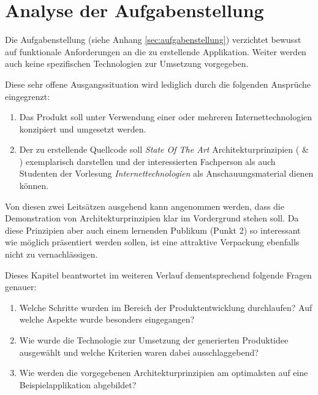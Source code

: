 \chapter{Analyse der Aufgabenstellung}

Die Aufgabenstellung (siehe Anhang \ref{sec:aufgabenstellung}) verzichtet bewusst auf funktionale Anforderungen an die zu erstellende Applikation. Weiter werden auch keine spezifischen Technologien zur Umsetzung vorgegeben.

Diese sehr offene Ausgangssituation wird lediglich durch die folgenden Ansprüche eingegrenzt:

\begin{enumerate}
	\item Das Produkt soll unter Verwendung einer oder mehreren Internettechnologien konzipiert und umgesetzt werden.
	\item Der zu erstellende Quellcode soll \emph{State Of The Art} Architekturprinzipien (\cite{ROCA} \& \cite{TilkovSlides}) exemplarisch darstellen und der interessierten Fachperson als auch Studenten der Vorlesung \emph{Internettechnologien} als Anschauungsmaterial dienen können.
\end{enumerate}

Von diesen zwei Leitsätzen ausgehend kann angenommen werden, dass die Demonstration von Architekturprinzipien klar im Vordergrund stehen soll. Da diese Prinzipien aber auch einem lernenden Publikum (Punkt 2) so interessant wie möglich präsentiert werden sollen, ist eine attraktive Verpackung ebenfalls nicht zu vernachlässigen.

Dieses Kapitel beantwortet im weiteren Verlauf dementsprechend folgende Fragen genauer:

\begin{enumerate}
	\item Welche Schritte wurden im Bereich der Produktentwicklung durchlaufen? Auf welche Aspekte wurde besonders eingegangen?
	\item Wie wurde die Technologie zur Umsetzung der generierten Produktidee ausgewählt und welche Kriterien waren dabei ausschlaggebend?
	\item Wie werden die vorgegebenen Architekturprinzipien am optimalsten auf eine Beispielapplikation abgebildet?
\end{enumerate}

\newpage


\newpage


\newpage


\newpage
